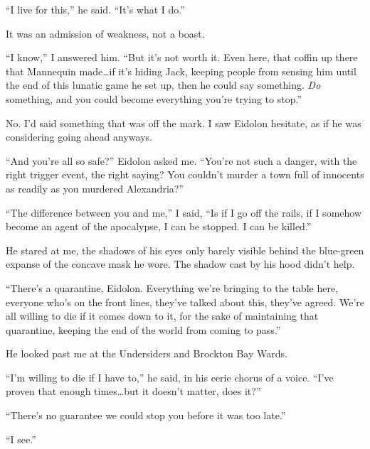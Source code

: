 ``I live for this,'' he said.  ``It's what I do.''



It was an admission of weakness, not a boast.



``I know,'' I answered him.  ``But it's not worth it.  Even here, that coffin up there that Mannequin made\ldots if it's hiding Jack, keeping people from sensing him until the end of this lunatic game he set up, then he could say something.  \emph{Do} something, and you could become everything you're trying to stop.''



No.  I'd said something that was off the mark.  I saw Eidolon hesitate, as if he was considering going ahead anyways.



``And you're all so safe?'' Eidolon asked me.  ``You're not such a danger, with the right trigger event, the right saying?  You couldn't murder a town full of innocents as readily as you murdered Alexandria?''



``The difference between you and me,'' I said, ``Is if I go off the rails, if I somehow become an agent of the apocalypse, I can be stopped.  I can be killed.''



He stared at me, the shadows of his eyes only barely visible behind the blue-green expanse of the concave mask he wore.  The shadow cast by his hood didn't help.



``There's a quarantine, Eidolon.  Everything we're bringing to the table here, everyone who's on the front lines, they've talked about this, they've agreed.  We're all willing to die if it comes down to it, for the sake of maintaining that quarantine, keeping the end of the world from coming to pass.''



He looked past me at the Undersiders and Brockton Bay Wards.



``I'm willing to die if I have to,'' he said, in his eerie chorus of a voice.  ``I've proven that enough times\ldots but it doesn't matter, does it?''



``There's no guarantee we could stop you before it was too late.''



``I see.''



